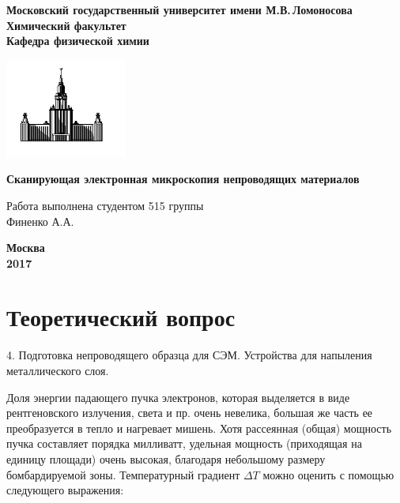 \documentclass[12pt]{article}
\begin{document}
 

\begin{titlepage}
\centering
\textbf{\large Московский государственный университет имени М.В.\,Ломоносова\\
\vspace*{0.1cm} Химический факультет\\
\vspace*{0.1cm}
\noindent\makebox[\linewidth]{\rule{\paperwidth}{0.4pt}}
\vspace*{0.1cm}
 Кафедра физической химии}
\vspace*{2cm}

\begin{center}
\includegraphics[width=0.3\textwidth]{pictures/logo.jpg}
\end{center}

\vspace*{2cm}
\Large \textbf{Сканирующая электронная микроскопия непроводящих материалов}
\vspace*{6cm}

\begin{flushright}
\large Работа выполнена студентом 515 группы\\
Финенко А.А.\\
\end{flushright}
\vfill
\large\textbf{Москва\\ 2017}
\end{titlepage}

\newpage
\section*{Теоретический вопрос}
4. Подготовка непроводящего  образца для СЭМ. Устройства для напыления металлического слоя. \par

Доля энергии падающего пучка электронов, которая выделяется в виде рентгеновского излучения, света и пр. очень невелика, большая же часть ее преобразуется в тепло и нагревает мишень. Хотя рассеянная (общая) мощность пучка составляет порядка милливатт, удельная мощность (приходящая на единицу площади) очень высокая, благодаря небольшому размеру бомбардируемой зоны. Температурный градиент $\Delta T$ можно оценить с помощью следующего выражения:
\end{document}

